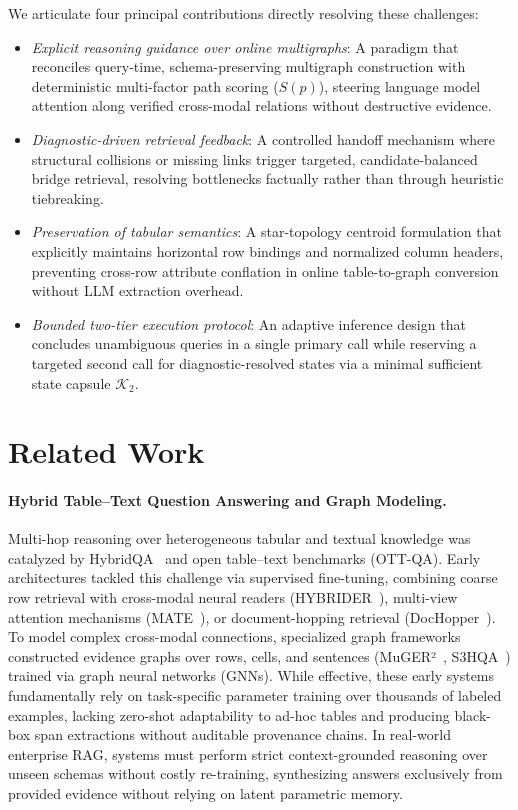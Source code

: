 \documentclass[runningheads]{llncs}
\begin{document}
\enlargethispage{2\baselineskip}
We articulate four principal contributions directly resolving these challenges:
\begin{itemize}
    \item \emph{Explicit reasoning guidance over online multigraphs}: A paradigm that reconciles query-time, schema-preserving multigraph construction with deterministic multi-factor path scoring ($S(p)$), steering language model attention along verified cross-modal relations without destructive evidence.
    \item \emph{Diagnostic-driven retrieval feedback}: A controlled handoff mechanism where structural collisions or missing links trigger targeted, candidate-balanced bridge retrieval, resolving bottlenecks factually rather than through heuristic tiebreaking.
    \item \emph{Preservation of tabular semantics}: A star-topology centroid formulation that explicitly maintains horizontal row bindings and normalized column headers, preventing cross-row attribute conflation in online table-to-graph conversion without LLM extraction overhead.
    \item \emph{Bounded two-tier execution protocol}: An adaptive inference design that concludes unambiguous queries in a single primary call while reserving a targeted second call for diagnostic-resolved states via a minimal sufficient state capsule $\mathcal{K}_2$.
\end{itemize}

\section{Related Work}
\label{sec:related}



\paragraph{Hybrid Table--Text Question Answering and Graph Modeling.}
Multi-hop reasoning over heterogeneous tabular and textual knowledge was catalyzed by HybridQA~\cite{hybridqa} and open table--text benchmarks (OTT-QA). Early architectures tackled this challenge via supervised fine-tuning, combining coarse row retrieval with cross-modal neural readers (HYBRIDER~\cite{hybridqa}), multi-view attention mechanisms (MATE~\cite{eisenschlos2021mate}), or document-hopping retrieval (DocHopper~\cite{sun2021dochopper}). To model complex cross-modal connections, specialized graph frameworks constructed evidence graphs over rows, cells, and sentences (MuGER²~\cite{chen2022muger2}, S3HQA~\cite{lei2023s3hqa}) trained via graph neural networks (GNNs). While effective, these early systems fundamentally rely on task-specific parameter training over thousands of labeled examples, lacking zero-shot adaptability to ad-hoc tables and producing black-box span extractions without auditable provenance chains. In real-world enterprise RAG, systems must perform strict context-grounded reasoning over unseen schemas without costly re-training, synthesizing answers exclusively from provided evidence without relying on latent parametric memory.
\end{document}
